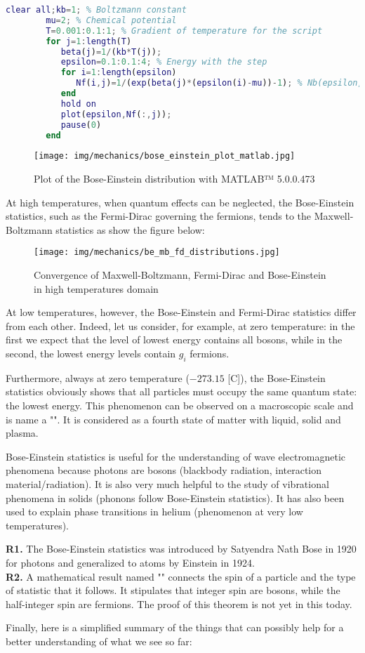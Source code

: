 	\begin{lstlisting}[language=MATLAB]
		clear all;kb=1; % Boltzmann constant
		mu=2; % Chemical potential
		T=0.001:0.1:1; % Gradient of temperature for the script
		for j=1:length(T)
		   beta(j)=1/(kb*T(j));
		   epsilon=0.1:0.1:4; % Energy with the step
		   for i=1:length(epsilon)
		      Nf(i,j)=1/(exp(beta(j)*(epsilon(i)-mu))-1); % Nb(epsilon,beta) average of fermions at the level of enery epsilon
		   end
		   hold on
		   plot(epsilon,Nf(:,j));
		   pause(0)
		end
	\end{lstlisting}
	\begin{figure}[H]
		\centering
		\texttt{[image: img/mechanics/bose\_einstein\_plot\_matlab.jpg]}
		\caption{Plot of the Bose-Einstein distribution with MATLAB™ 5.0.0.473}
	\end{figure}
	At high temperatures, when quantum effects can be neglected, the Bose-Einstein statistics, such as the Fermi-Dirac governing the fermions, tends to the Maxwell-Boltzmann statistics as show the figure below:
	\begin{figure}[H]
		\centering
		\texttt{[image: img/mechanics/be\_mb\_fd\_distributions.jpg]}
		\caption{Convergence of Maxwell-Boltzmann, Fermi-Dirac and Bose-Einstein in high temperatures domain}
	\end{figure}
	At low temperatures, however, the Bose-Einstein and Fermi-Dirac statistics  differ from each other. Indeed, let us consider, for example, at zero temperature: in the first we expect that the level of lowest energy contains all bosons, while in the second, the lowest energy levels contain $g_i$ fermions.
	
	Furthermore, always at zero temperature ($-273.15$ [C]), the Bose-Einstein statistics obviously shows that all particles must occupy the same quantum state: the lowest energy. This phenomenon can be observed on a macroscopic scale and is name a "". It is considered as a fourth state of matter with liquid, solid and plasma.
	
	Bose-Einstein statistics is useful for the understanding of wave electromagnetic phenomena because photons are bosons (blackbody radiation, interaction material/radiation). It is also very much helpful to the study of vibrational phenomena in solids (phonons follow Bose-Einstein statistics). It has also been used to explain phase transitions in helium (phenomenon at very low temperatures).
	\begin{tcolorbox}[title=Remarks,colframe=black,arc=10pt]
	\textbf{R1.} The Bose-Einstein statistics was introduced by Satyendra Nath Bose in 1920 for photons and generalized to atoms by Einstein in 1924.\\
	
	\textbf{R2.} A mathematical result named "" connects the spin of a particle and the type of statistic that it follows. It stipulates that integer spin are bosons, while the half-integer spin are fermions. The proof of this theorem is not yet in this today.
	\end{tcolorbox}
	Finally, here is a simplified summary of the things that can possibly help for a better understanding of what we see so far:
	
